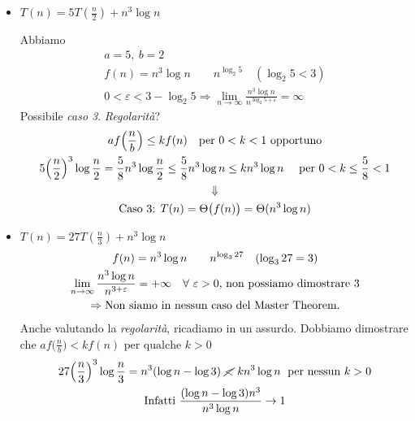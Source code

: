 \begin{itemize}[label=$\bullet$]
    \item $T(n) = 5T(\frac{n}{2}) + n^3 \log n$ \par
    Abbiamo 
    \begin{gather*}
        a = 5, \ b = 2 \\
        f(n) = n^3 \log n \qquad n^{\log_2 5} \quad (\log_2 5 < 3) \\
        0 < \varepsilon < 3 - \log_2 5 \Rightarrow
            \lim_{n \to \infty} \frac{n^3 \log n}{n^{\log_2 5 + \varepsilon}} = \infty
    \end{gather*}
    Possibile \emph{caso 3}. \emph{Regolarità}?
    \begin{gather*}
        af\Big(\frac{n}{b}\Big) \leq kf(n) \quad \text{per } 0 < k < 1 \text{ opportuno} \\
        5 \Big(\frac{n}{2}\Big)^3 \log \frac{n}{2} = \frac{5}{8}n^3 \log \frac{n}{2} 
            \leq \frac{5}{8} n^3 \log n \leq kn^3 \log n \quad \text{ per } 0 < k \leq \frac{5}{8} < 1 \\
            \Downarrow \\
            \text{\emph{Caso 3}: } T(n) = \Theta \big(f(n)\big) = \Theta(n^3 \log n)
    \end{gather*}

    \item $T(n) = 27T(\frac{n}{3}) + n^3 \log n$ 
    \begin{gather*}
        f(n) = n^3 \log n \qquad n^{\log_3 27} \quad (\log_3 27 = 3) \\
        \lim_{n \to \infty} \frac{n^3 \log n}{n^{3 + \varepsilon}} = +\infty \quad \forall \varepsilon > 0 
            \text{, non possiamo dimostrare 3}\\
        \Rightarrow \text{Non siamo in \emph{nessun} caso del Master Theorem.}
    \end{gather*}
    Anche valutando la \emph{regolarità}, ricadiamo in un assurdo. Dobbiamo dimostrare che
    $af \big( \frac{n}{b} \big) < kf(n) \text{ per qualche } k > 0$
    \begin{gather*}
        27 \Big( \frac{n}{3} \Big)^3 \log \frac{n}{3} = n^3(\log n - \log 3) \ \cancel{<} \ k n^3 \log n \; \text{ per nessun } k > 0\\
        \text{Infatti } \frac{(\log n - \log 3)n^3}{n^3 \log n} \rightarrow 1
    \end{gather*}


\end{itemize}
